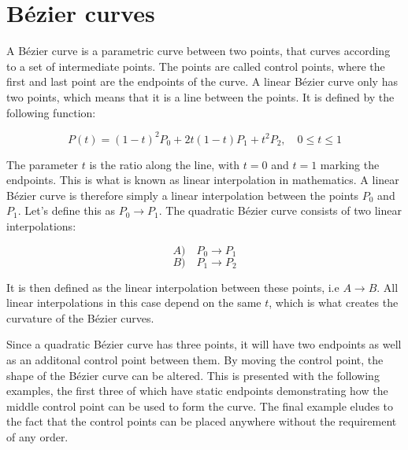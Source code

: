 \newcommand{\timeconstraint}{, \quad 0 \le t \le 1}
\newcommand{\lerp}{\rightarrow}
\newcommand{\p}[1]{P\textsubscript{#1}}

\section{Bézier curves}
    A Bézier curve is a parametric curve between two points, that curves according to a set of intermediate points. The points are called control points, where the first and last point are the endpoints of the curve. A linear Bézier curve only has two points, which means that it is a line between the points. It is defined by the following function:

    $$
        P(t) = (1-t)^2P_0 + 2t(1-t)P_1 + t^2P_2 \timeconstraint
    $$

    The parameter $t$ is the ratio along the line, with $t = 0$ and $t = 1$ marking the endpoints. This is what is known as linear interpolation in mathematics. A linear Bézier curve is therefore simply a linear interpolation between the points $P_0$ and $P_1$. Let's define this as $P_0 \lerp P_1$. The quadratic Bézier curve consists of two linear interpolations:
    
    $$ A) \quad P_0 \lerp P_1$$
    $$ B) \quad P_1 \lerp P_2 $$
    
    It is then defined as the linear interpolation between these points, i.e $ A \lerp B $. All linear interpolations in this case depend on the same $t$, which is what creates the curvature of the Bézier curves.

    Since a quadratic Bézier curve has three points, it will have two endpoints as well as an additonal control point between them. By moving the control point, the shape of the Bézier curve can be altered. This is presented with the following examples, the first three of which have static endpoints demonstrating how the middle control point can be used to form the curve. The final example eludes to the fact that the control points can be placed anywhere without the requirement of any order.


